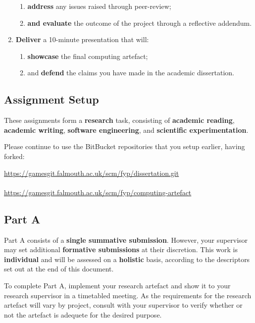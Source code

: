 \begin{enumerate}[label=(\Alph*)]
\begin{enumerate}[label=(\roman*)]
			\item \textbf{address} any issues raised through peer-review;
			\item \textbf{and evaluate} the outcome of the project through a reflective addendum.
		\end{enumerate}
	\item \textbf{Deliver} a 10-minute presentation that will:
		\begin{enumerate}[label=(\roman*)]
			\item \textbf{showcase} the final computing artefact;
			\item and \textbf{defend} the claims you have made in the academic dissertation.
		\end{enumerate}
\end{enumerate}

\subsection*{Assignment Setup}

These assignments form a \textbf{research} task, consisting of \textbf{academic reading}, \textbf{academic writing},
\textbf{software engineering}, and \textbf{scientific experimentation}.

Please continue to use the BitBucket repositories that you setup earlier, having forked:

\indent \url{https://gamesgit.falmouth.ac.uk/scm/fyp/dissertation.git}\\
\\
\indent \url{https://gamesgit.falmouth.ac.uk/scm/fyp/computing-artefact}

\subsection*{Part A}

Part A consists of a \textbf{single summative submission}.
However, your supervisor may set additional \textbf{formative submissions} at their discretion.
This work is \textbf{individual} and will be assessed on a \textbf{holistic} basis, according to the descriptors set out at the end of this document.

To complete Part A, implement your research artefact and show it to your research supervisor in a timetabled meeting. As
the requirements for the research artefact will vary by project, consult with your supervisor to verify whether or not the
artefact is adequete for the desired purpose.

